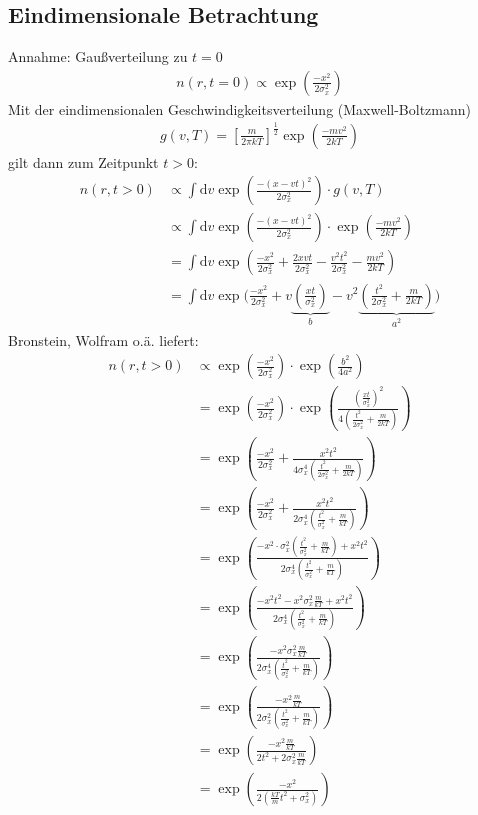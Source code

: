 \documentclass[10pt,a4paper]{extarticle}
\begin{document}
\subsection*{Eindimensionale Betrachtung}
Annahme: Gaußverteilung zu $t = 0$
\begin{align}
n(r, t= 0) \varpropto \exp\left(\frac{-x^2}{2 \sigma_x^2}\right)
\end{align}
Mit der eindimensionalen Geschwindigkeitsverteilung (Maxwell-Boltzmann) 
\begin{align}
g(v,T) = \left[\frac{m}{2 \pi k T}\right]^{\frac{1}{2}} \exp \left(\frac{-mv^2}{2kT}\right)
\end{align}
gilt dann zum Zeitpunkt $t>0$:
\begin{align}
n(r, t> 0) &\varpropto \int \mathrm{d}v \exp\left(\frac{-(x-vt)^2}{2 \sigma_x^2}\right) \cdot g(v,T) \\
&\varpropto \int \mathrm{d}v \exp\left(\frac{-(x-vt)^2}{2 \sigma_x^2}\right) \cdot \exp \left(\frac{-mv^2}{2kT}\right) \label{eq:falt} \\
&= \int \mathrm{d}v \exp\left(\frac{-x^2}{2 \sigma_x^2} + \frac{2xvt}{2 \sigma_x^2} - \frac{v^2 t^2}{2 \sigma_x^2} - \frac{mv^2}{2kT}\right) \\
&= \int \mathrm{d}v \exp\biggl(\frac{-x^2}{2 \sigma_x^2} + v \underbrace{\left( \frac{xt}{\sigma_x^2}\right)}_{b} - v^2 \underbrace{\left(\frac{t^2}{2 \sigma_x^2} + \frac{m}{2kT} \right)}_{a^2}\biggr) 
\end{align}
Bronstein, Wolfram o.ä. liefert:
\begin{align}
n(r, t> 0) &\varpropto \exp\left(\frac{-x^2}{2 \sigma_x^2}\right) \cdot \exp \left(\frac{b^2}{4a^2}\right) \\
&= \exp\left(\frac{-x^2}{2 \sigma_x^2}\right) \cdot \exp \left(\frac{\left( \frac{xt}{\sigma_x^2}\right)^2}{4\left(\frac{t^2}{2 \sigma_x^2} + \frac{m}{2kT} \right)}\right) \\
&= \exp\left(\frac{-x^2}{2 \sigma_x^2} + \frac{x^2t^2}{4\sigma_x^4\left(\frac{t^2}{2 \sigma_x^2} + \frac{m}{2kT} \right)}\right) \\
&= \exp\left(\frac{-x^2}{2 \sigma_x^2} + \frac{x^2t^2}{2\sigma_x^4\left(\frac{t^2}{\sigma_x^2} + \frac{m}{kT} \right)}\right) \\
&= \exp\left(\frac{-x^2 \cdot \sigma_x^2\left(\frac{t^2}{\sigma_x^2} + \frac{m}{kT} \right) +x^2t^2}{2\sigma_x^4\left(\frac{t^2}{\sigma_x^2} + \frac{m}{kT} \right)}\right) \\
&= \exp\left(\frac{-x^2 t^2 -  x^2 \sigma_x^2 \frac{m}{kT} +x^2t^2}{2\sigma_x^4\left(\frac{t^2}{\sigma_x^2} + \frac{m}{kT} \right)}\right) \\
&= \exp\left(\frac{- x^2 \sigma_x^2 \frac{m}{kT}}{2\sigma_x^4\left(\frac{t^2}{\sigma_x^2} + \frac{m}{kT} \right)}\right) \\
&= \exp\left(\frac{- x^2 \frac{m}{kT}}{2\sigma_x^2\left(\frac{t^2}{\sigma_x^2} + \frac{m}{kT} \right)}\right) \\
&= \exp\left(\frac{- x^2 \frac{m}{kT}}{2t^2 +2 \sigma_x^2 \frac{m}{kT} }\right) \\
&= \exp\left(\frac{- x^2 }{2\left(\frac{kT}{m}t^2 + \sigma_x^2\right)}\right) 
\end{align}
\end{document}

